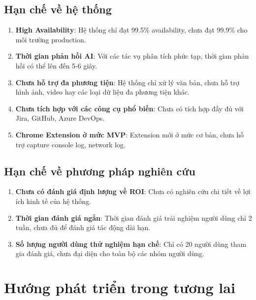 \documentclass[12pt,a4paper]{report}
\begin{document}
\subsection{Hạn chế về hệ thống}

\begin{enumerate}
\item \textbf{High Availability}:
Hệ thống chỉ đạt 99.5\% availability, chưa đạt 99.9\% cho môi trường production.

\item \textbf{Thời gian phản hồi AI}:
Với các tác vụ phân tích phức tạp, thời gian phản hồi có thể lên đến 5-6 giây.

\item \textbf{Chưa hỗ trợ đa phương tiện}:
Hệ thống chỉ xử lý văn bản, chưa hỗ trợ hình ảnh, video hay các loại dữ liệu đa phương tiện khác.

\item \textbf{Chưa tích hợp với các công cụ phổ biến}:
Chưa có tích hợp đầy đủ với Jira, GitHub, Azure DevOps.

\item \textbf{Chrome Extension ở mức MVP}:
Extension mới ở mức cơ bản, chưa hỗ trợ capture console log, network log.
\end{enumerate}

\subsection{Hạn chế về phương pháp nghiên cứu}

\begin{enumerate}
\item \textbf{Chưa có đánh giá định lượng về ROI}:
Chưa có nghiên cứu chi tiết về lợi ích kinh tế của hệ thống.

\item \textbf{Thời gian đánh giá ngắn}:
Thời gian đánh giá trải nghiệm người dùng chỉ 2 tuần, chưa đủ để đánh giá tác động dài hạn.

\item \textbf{Số lượng người dùng thử nghiệm hạn chế}:
Chỉ có 20 người dùng tham gia đánh giá, chưa đại diện cho toàn bộ các nhóm người dùng.
\end{enumerate}

\section{Hướng phát triển trong tương lai}
\end{document}
